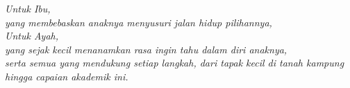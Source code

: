 \acknowledgment
\begin{centering}
\vfill
\emph{Untuk Ibu,\\yang membebaskan anaknya menyusuri jalan hidup pilihannya,\\ Untuk Ayah,\\ yang sejak kecil menanamkan rasa ingin tahu dalam diri anaknya,\\serta semua yang mendukung setiap langkah, dari tapak kecil di tanah kampung hingga capaian akademik ini.\\[.5cm]}
\vfill
\end{centering}
